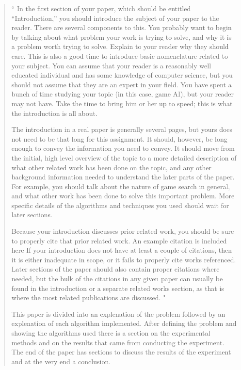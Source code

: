 \documentclass[12pt,letterpaper]{article}
\begin{document}
\begin{quote}
`` 
In the first section of your paper, which should be entitled ``Introduction,''
you should introduce the subject of your paper to the reader.  There are several
components to this.  You probably want to begin by talking about what problem
your work is trying to solve, and why it is a problem worth trying to solve.
Explain to your reader why they should care.  This is also a good time to
introduce basic nomenclature related to your subject.  You can assume that your
reader is a reasonably well educated individual and has some knowledge of
computer science, but you should not assume that they are an expert in your field.  You have
spent a bunch of time studying your topic (in this case, game AI), but
your reader may not have.  Take the time to bring him or her up to speed; this
is what the introduction is all about.

The introduction in a real paper is generally several pages, but yours does not
need to be that long for this assignment.  It should, however, be long enough to
convey the information you need to convey.  It should move from the initial, high level
overview of the topic to a more detailed description of what other related work
has been done on the topic, and any other background information needed to
understand the later parts of the paper.  For example, you should talk about the nature
of game search in general, and what other work has been
done to solve this important problem.  More specific details of the algorithms and
techniques you used should wait for later sections.

Because your introduction discusses prior related work, you should be sure to
properly cite that prior related work. An example citation is included here
If your introduction does not have at
least a couple of citations, then it is either inadequate in scope, or it fails
to properly cite works referenced.  Later sections of the
paper should also contain proper citations where needed, but the bulk of the
citations in any given paper can usually be found in the introduction or a 
separate related works section, as that
is where the most related publications are discussed.
"

This paper is divided into an explenation of the problem followed by an explenation of each algorithm implemented. After defining the problem and showing the algorithms used there is a section on the experimental methods and on the results that came from conducting the experiment. The end of the paper has sections to discuss the results of the experiment and at the very end a conclusion.
\end{quote}
\end{document}
